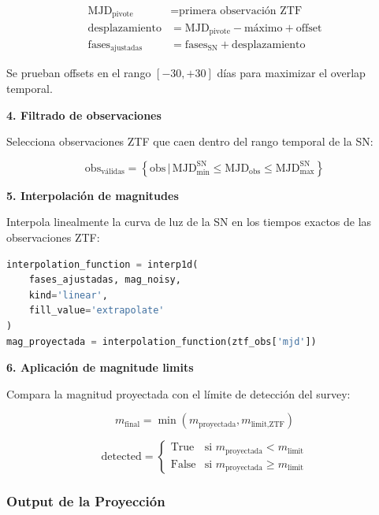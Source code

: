 \documentclass[11pt,a4paper]{article}
\begin{document}
\begin{align}
\text{MJD}_{\text{pivote}} &= \text{primera observación ZTF} \\
\text{desplazamiento} &= \text{MJD}_{\text{pivote}} - \text{máximo} + \text{offset} \\
\text{fases}_{\text{ajustadas}} &= \text{fases}_{\text{SN}} + \text{desplazamiento}
\end{align}

Se prueban offsets en el rango $[-30, +30]$ días para maximizar el overlap temporal.

\textbf{4. Filtrado de observaciones}

Selecciona observaciones ZTF que caen dentro del rango temporal de la SN:

\begin{equation}
\text{obs}_{\text{válidas}} = \left\{ \text{obs} \, | \, \text{MJD}_{\min}^{\text{SN}} \leq \text{MJD}_{\text{obs}} \leq \text{MJD}_{\max}^{\text{SN}} \right\}
\end{equation}

\textbf{5. Interpolación de magnitudes}

Interpola linealmente la curva de luz de la SN en los tiempos exactos de las observaciones ZTF:

\begin{lstlisting}[language=Python, caption=Interpolación]
interpolation_function = interp1d(
    fases_ajustadas, mag_noisy, 
    kind='linear', 
    fill_value='extrapolate'
)
mag_proyectada = interpolation_function(ztf_obs['mjd'])
\end{lstlisting}

\textbf{6. Aplicación de magnitude limits}

Compara la magnitud proyectada con el límite de detección del survey:

\begin{equation}
m_{\text{final}} = \min(m_{\text{proyectada}}, m_{\text{limit,ZTF}})
\end{equation}

\begin{equation}
\text{detected} = 
\begin{cases}
\text{True} & \text{si } m_{\text{proyectada}} < m_{\text{limit}} \\
\text{False} & \text{si } m_{\text{proyectada}} \geq m_{\text{limit}}
\end{cases}
\end{equation}

\subsubsection{Output de la Proyección}
\end{document}
